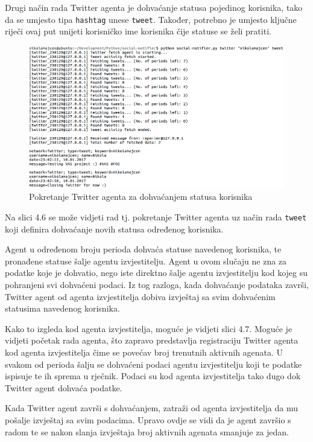 \documentclass[a4paper,12pt]{foi}
\begin{document}
Drugi način rada Twitter agenta je dohvaćanje statusa pojedinog korisnika, tako da se umjesto tipa \texttt{hashtag} unese \texttt{tweet}. Također, potrebno je umjesto ključne riječi ovaj put unijeti korisničko ime korisnika čije statuse se želi pratiti.

\begin{figure}[h]
\includegraphics[width=\linewidth, frame]{06-twitter-tweet-fetch}
	\caption{Pokretanje Twitter agenta za dohvaćanjem statusa korisnika}
\end{figure}

Na slici 4.6 se može vidjeti rad tj. pokretanje Twitter agenta uz način rada \texttt{tweet} koji definira dohvaćanje novih statusa određenog korisnika. 

Agent u određenom broju perioda dohvaća statuse navedenog korisnika, te pronađene statuse šalje agentu izvjestitelju. Agent u ovom slučaju ne zna za podatke koje je dohvatio, nego iste direktno šalje agentu izvjestitelju kod kojeg su pohranjeni svi dohvaćeni podaci. Iz tog razloga, kada dohvaćanje podataka završi, Twitter agent od agenta izvjestitelja dobiva izvještaj sa svim dohvaćenim statusima navedenog korisnika.

Kako to izgleda kod agenta izvjestitelja, moguće je vidjeti slici 4.7. Moguće je vidjeti početak rada agenta, što zapravo predstavlja registraciju Twitter agenta kod agenta izvjestitelja čime se povećav broj trenutnih aktivnih agenata. U svakom od perioda šalju se dohvaćeni podaci agentu izvjestitelju koji te podatke ispisuje te ih sprema u rječnik. Podaci su kod agenta izvjestitelja tako dugo dok Twitter agent dohvaća podatke.

Kada Twitter agent završi s dohvaćanjem, zatraži od agenta izvjestitelja da mu pošalje izvještaj sa svim podacima. Upravo ovdje se vidi da je agent završio s radom te se nakon slanja izvještaja broj aktivnih agenata smanjuje za jedan.
\end{document}
